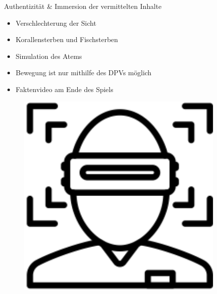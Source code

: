 \documentclass{beamer}
\begin{document}
\begin{frame}{Authentizität \& Immersion der vermittelten Inhalte}
\begin{minipage}[c]{0.72\textwidth}
\begin{itemize}
\item Verschlechterung der Sicht
\item Korallensterben und Fischsterben
\item Simulation des Atems
\item Bewegung ist nur mithilfe des DPVs möglich
\item Faktenvideo am Ende des Spiels
\end{itemize}
\end{minipage}
\hfill
\begin{minipage}[c]{0.25\textwidth}
\begin{figure}
\centering
\includegraphics[width=0.9\textwidth, keepaspectratio]{img/immersion}
\caption{\cite{c}}
\end{figure}
\end{minipage}
\end{frame}
\end{document}
